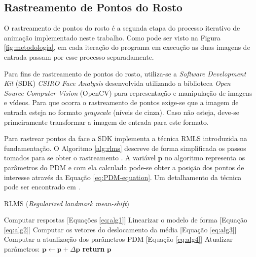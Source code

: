\subsection{Rastreamento de Pontos do Rosto}

O rastreamento de pontos do rosto é a segunda etapa do processo iterativo de animação implementado neste trabalho. Como pode ser visto na Figura \ref{fig:metodologia}, em cada iteração do programa em execução as duas imagens de entrada passam por esse processo separadamente.

Para fins de rastreamento de pontos do rosto, utiliza-se a  \textit{Software Development Kit} (SDK) \textit{CSIRO Face Analysis} \cite{cox2013csiro} desenvolvida utilizando a biblioteca  \textit{Open Source Computer Vision} (OpenCV) para representação e manipulação de imagens e vídeos. Para que ocorra o rastreamento de pontos exige-se que a imagem de entrada esteja no formato \textit{grayscale} (níveis de cinza). Caso não esteja, deve-se primeiramente transformar a imagem de entrada para este formato. 

Para rastrear pontos da face a SDK implementa a técnica RMLS introduzida na fundamentação. O Algoritmo \ref{alg:rlms} descreve de forma simplificada os passos tomados para se obter o rastreamento \cite{saragih2011deformable}. A variável $\mathbf{p}$ no algoritmo representa os parâmetros do PDM e com ela calculada pode-se obter a posição dos pontos de interesse através da Equação \ref{eq:PDM-equation}. Um detalhamento da técnica pode ser encontrado em  \cite{saragih2011deformable}.

\begin{algorithm}[!htb]
\caption{RLMS (\textit{Regularized landmark mean-shift})}\label{alg:rlms}
\begin{algorithmic}[1]
 
\State Computar respostas [Equações \ref{eq:alg1}]
   \State Linearizar o modelo de forma [Equação \ref{eq:alg2}]
   \State Computar os vetores do deslocamento da média [Equação \ref{eq:alg3}]
   \State Computar a atualização dos parâmetros PDM [Equação \ref{eq:alg4}]
   \State Atualizar parâmetros: $\textbf{p} \leftarrow \textbf{p} + \Delta\textbf{p}$
   \EndWhile
   \State \textbf{return} $\textbf{p}$
\end{algorithmic}
\end{algorithm}





